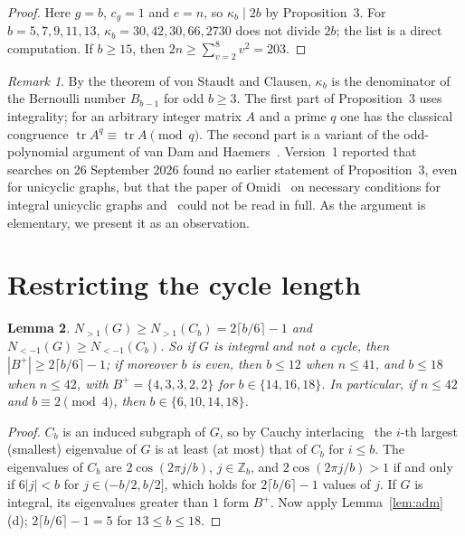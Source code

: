 \documentclass[11pt]{article}
\newtheorem{lemma}{Lemma}[section]
\theoremstyle{definition}
\theoremstyle{remark}
\newtheorem{remark}[lemma]{Remark}
\DeclareMathOperator{\tr}{tr}
\newcommand{\Z}{\mathbb Z}
\begin{document}
\begin{proof}
Here $g=b$, $c_g=1$ and $e=n$, so $\kappa_b\mid2b$ by Proposition~3. For
$b=5,7,9,11,13$, $\kappa_b=30,42,30,66,2730$ does not divide $2b$; the list is a
direct computation. If $b\ge15$, then $2n\ge\sum_{v=2}^8v^2=203$.
\end{proof}

\begin{remark}\label{rem:novelty}
By the theorem of von Staudt and Clausen, $\kappa_b$ is the denominator of the
Bernoulli number $B_{b-1}$ for odd $b\ge3$. The first part of
Proposition~3 uses integrality; for an arbitrary integer matrix $A$ and a
prime $q$ one has the classical congruence $\tr A^q\equiv\tr A\pmod q$. The
second part is a variant of the odd-polynomial argument of van Dam and
Haemers~\cite[Section~2]{vdh}. Version~1 reported that searches on
26 September 2026 found no earlier statement of Proposition~3, even for
unicyclic graphs, but that the paper of Omidi~\cite{om} on necessary
conditions for integral unicyclic graphs and~\cite{bdr} could not be read in
full. As the argument is elementary, we present it as an observation.
\end{remark}

\section{Restricting the cycle length}\label{sec:cycle}

\begin{lemma}\label{lem:cycle}
$N_{>1}(G)\ge N_{>1}(C_b)=2\lceil b/6\rceil-1$ and
$N_{<-1}(G)\ge N_{<-1}(C_b)$. So if $G$ is integral and not a cycle, then
$|B^+|\ge2\lceil b/6\rceil-1$; if moreover $b$ is even, then $b\le12$ when
$n\le41$, and $b\le18$ when $n\le42$, with $B^+=\{4,3,3,2,2\}$ for
$b\in\{14,16,18\}$. In particular, if $n\le42$ and $b\equiv2\pmod 4$, then
$b\in\{6,10,14,18\}$.
\end{lemma}

\begin{proof}
$C_b$ is an induced subgraph of $G$, so by Cauchy interlacing~\cite{bh} the
$i$-th largest (smallest) eigenvalue of $G$ is at least (at most) that of $C_b$
for $i\le b$. The eigenvalues of $C_b$ are $2\cos(2\pi j/b)$, $j\in\Z_b$, and
$2\cos(2\pi j/b)>1$ if and only if $6|j|<b$ for $j\in(-b/2,b/2]$, which holds
for $2\lceil b/6\rceil-1$ values of $j$. If $G$ is integral, its eigenvalues
greater than $1$ form $B^+$. Now apply Lemma~\ref{lem:adm}(d);
$2\lceil b/6\rceil-1=5$ for $13\le b\le18$.
\end{proof}
\end{document}

